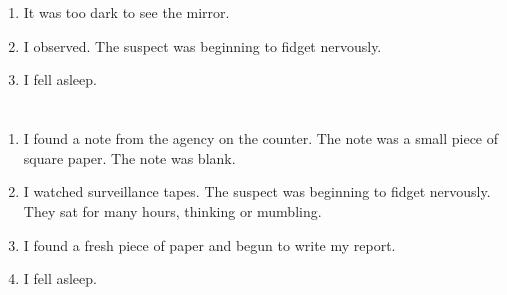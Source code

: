\documentclass{article}
\begin{document}
    \newpage
    
    \section{}
    
    \begin{enumerate}
    
    \item It was too dark to see the mirror.\\
    
    \item I observed. The suspect was beginning to fidget nervously.\\
    
    \item I fell asleep.\\
    
    \end{enumerate}
     
    \newpage
    
    \section{}
    
    \begin{enumerate}
    
    \item I found a note from the agency on the counter. The note was a small piece of square paper. The note was blank.\\
    
    \item I watched surveillance tapes. The suspect was beginning to fidget nervously. They sat for many hours, thinking or mumbling.\\
    
    \item I found a fresh piece of paper and begun to write my report.\\
    
    \item I fell asleep.\\
    
    \end{enumerate}
     
    \newpage
    
    \section{}
    
\end{document}
